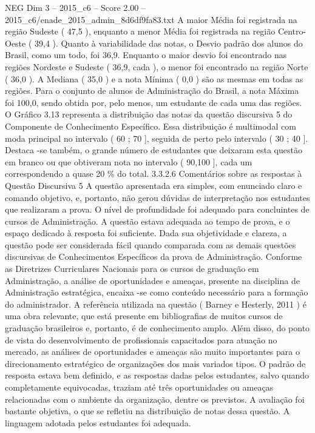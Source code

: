 \begin{textsample}{NEG Dim 3 – 2015\_c6 – Score 2.00 – 2015\_c6/enade\_2015\_admin\_8d6df9fa83.txt}
A maior Média foi registrada na região Sudeste ( 47,5 ), enquanto a menor Média foi registrada na região Centro-Oeste ( 39,4 ).
Quanto à variabilidade das notas, o Desvio padrão dos alunos do Brasil, como um todo, foi 36,9.
Enquanto o maior desvio foi encontrado nas regiões Nordeste e Sudeste ( 36,9, cada ), o menor foi encontrado na região Norte ( 36,0 ).
A Mediana ( 35,0 ) e a nota Mínima ( 0,0 ) são as mesmas em todas as regiões.
Para o conjunto de alunos de Administração do Brasil, a nota Máxima foi 100,0, sendo obtida por, pelo menos, um estudante de cada uma das regiões.
O Gráfico 3.13 representa a distribuição das notas da questão discursiva 5 do Componente de Conhecimento Específico.
Essa distribuição é multimodal com moda principal no intervalo ( 60 ; 70 ], seguida de perto pelo intervalo ( 30 ; 40 ].
Destaca -se também, o grande número de estudantes que deixaram esta questão em branco ou que obtiveram nota no intervalo ( 90,100 ], cada um correspondendo a quase 20 \% do total. 3.3.2.6 Comentários sobre as respostas à Questão Discursiva 5 A questão apresentada era simples, com enunciado claro e comando objetivo, e, portanto, não gerou dúvidas de interpretação nos estudantes que realizaram a prova.
O nível de profundidade foi adequado para concluintes de cursos de Administração.
A questão estava adequada ao tempo de prova, e o espaço dedicado à resposta foi suficiente.
Dada sua objetividade e clareza, a questão pode ser considerada fácil quando comparada com as demais questões discursivas de Conhecimentos Específicos da prova de Administração.
Conforme as Diretrizes Curriculares Nacionais para os cursos de graduação em Administração, a análise de oportunidades e ameaças, presente na disciplina de Administração estratégica, encaixa -se como conteúdo necessário para a formação do administrador.
A referência utilizada na questão ( Barney e Hesterly, 2011 ) é uma obra relevante, que está presente em bibliografias de muitos cursos de graduação brasileiros e, portanto, é de conhecimento amplo.
Além disso, do ponto de vista do desenvolvimento de profissionais capacitados para atuação no mercado, as análises de oportunidades e ameaças são muito importantes para o direcionamento estratégico de organizações dos mais variados tipos.
O padrão de resposta estava bem definido, e as respostas dadas pelos estudantes, salvo quando completamente equivocadas, traziam até três oportunidades ou ameaças relacionadas com o ambiente da organização, dentre os previstos.
A avaliação foi bastante objetiva, o que se refletiu na distribuição de notas dessa questão.
A linguagem adotada pelos estudantes foi adequada.

\end{textsample}
